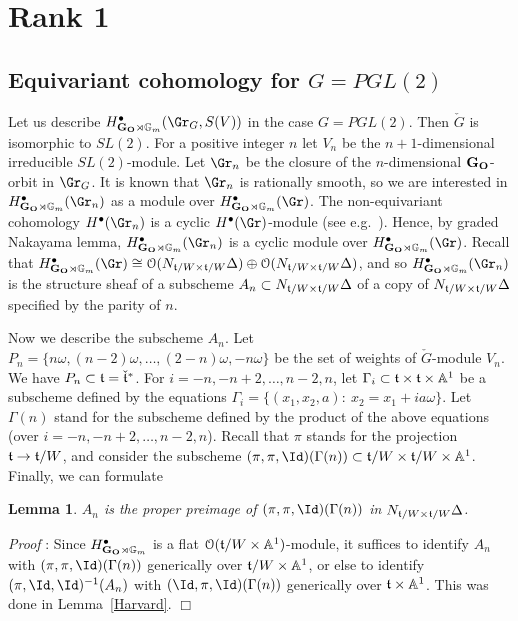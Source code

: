 \documentclass[11pt]{amsart}
\newtheorem{lem}{Lemma}
\theoremstyle{definition}
\theoremstyle{remark}
\renewcommand{\O}{{\mathcal O}}
\theoremstyle{remark}
\newcommand{\cal}{\mathcal}
\newcommand{\<}{\langle}
\renewcommand{\>}{\rangle}
\renewcommand{\t}{{\frak t}}
\newcommand{\Lt}{\check{\mathfrak t}{}}
\newcommand{\LG}{{\check{G}}}
\renewcommand{\O}{{\cal O}}
\newcommand{\GO}{{\bf G_O}}
\newcommand{\Aone}{{\mathbb A}^1}
\newcommand{\Gm}{{{\mathbb G}_m}}
\renewcommand{\proof}{{\it Proof }}
\begin{document}
\section{Rank 1}


\subsection{Equivariant cohomology for $G=PGL(2)$}
\label{before}
Let us describe 
$H^\bullet_{\GO\rtimes\Gm}(\Gr_G,S(V))$ in the case $G=PGL(2)$. 
Then $\LG$ is isomorphic to $SL(2)$.
For a positive integer $n$ let $V_n$ be the $n+1$-dimensional irreducible
$SL(2)$-module. Let $\Gr_n$ be the closure of the $n$-dimensional $\GO$-orbit
in $\Gr_G$. It is known that $\Gr_n$ is rationally smooth, so we are 
interested in $H^\bullet_{\GO\rtimes\Gm}(\Gr_n)$ as a module over
$H^\bullet_{\GO\rtimes\Gm}(\Gr)$. The non-equivariant cohomology
$H^\bullet(\Gr_n)$ is a cyclic $H^\bullet(\Gr)$-module (see e.g.~\cite{G1}).
Hence, by graded Nakayama lemma, $H^\bullet_{\GO\rtimes\Gm}(\Gr_n)$ is a cyclic
module over $H^\bullet_{\GO\rtimes\Gm}(\Gr)$. Recall that
$H^\bullet_{\GO\rtimes\Gm}(\Gr)\cong\O(N_{\t/W\times\t/W}\Delta)\oplus
\O(N_{\t/W\times\t/W}\Delta)$, and so $H^\bullet_{\GO\rtimes\Gm}(\Gr_n)$
is the structure sheaf of a subscheme $A_n\subset N_{\t/W\times\t/W}\Delta$
of a copy of $N_{\t/W\times\t/W}\Delta$ specified by the parity of $n$.


Now we describe the subscheme $A_n$. Let $P_n=\{n\omega,(n-2)\omega,\ldots,
(2-n)\omega,-n\omega\}$ be the set of weights of $\LG$-module $V_n$.
We have $P_n\subset\t=\Lt^*$. For $i=-n,-n+2,\ldots,n-2,n$,
let $\Gamma_i\subset\t\times\t\times\Aone$
be a subscheme defined by the equations $\Gamma_i=\{(x_1,x_2,a):\
x_2=x_1+ia\omega\}$. Let $\Gamma(n)$ stand for the subscheme defined by
the product of the above equations (over $i=-n,-n+2,\ldots,n-2,n$).
Recall that $\pi$ stands for the projection $\t\to\t/W$,
and consider the subscheme 
$(\pi,\pi,\Id)(\Gamma(n))\subset\t/W\times\t/W\times\Aone$. 
Finally, we can formulate


\begin{lem}
\label{top}
$A_n$ is the proper preimage of $(\pi,\pi,\Id)(\Gamma(n))$ in
$N_{\t/W\times\t/W}\Delta$.
\end{lem}

\proof: 
Since $H^\bullet_{\GO\rtimes\Gm}$ is a flat $\O(\t/W\times\Aone)$-module,
it suffices to identify $A_n$ with $(\pi,\pi,\Id)(\Gamma(n))$ generically
over $\t/W\times\Aone$, or else to identify $(\pi,\Id,\Id)^{-1}(A_n)$
with $(\Id,\pi,\Id)(\Gamma(n))$ generically over $\t\times\Aone$.
This was done in Lemma~\ref{Harvard}.
\hfill $\Box$
\end{document}
